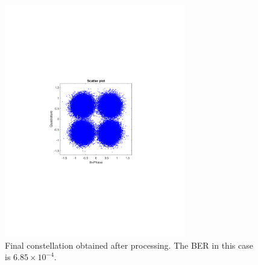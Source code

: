 \begin{refsection}
\begin{figure}[H]
	\centering
	\includegraphics[clip, trim=4cm 8cm 4cm 8cm,
	width=0.7\textwidth]{./sdf/m_qam_system/figures/expResults/homodyne/6_16GBdInSig13dB_const.pdf}
	\caption{Final constellation obtained after processing. The BER in this case is $6.85 \times 10^{-4}$.}
	\label{fig:16GBdFinalHm}
\end{figure}


\end{refsection}
